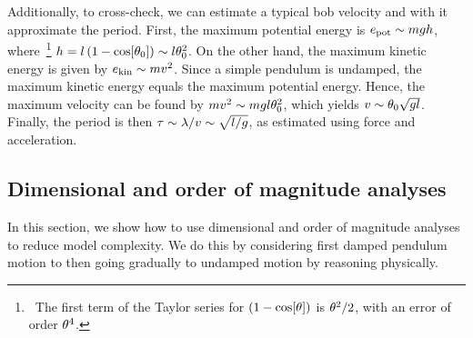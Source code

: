 Additionally, to cross-check, we can estimate a typical bob velocity and with it approximate the period. First, the maximum potential energy is $e_\text{pot}\sim mgh$, where~\footnote{~The first term of the Taylor series for $\left(1 - \cos\!\left[{\theta}\right]\right)$ is $\theta^2/2$, with an error of order $\theta^4$.} $h = l\left(1 - \cos\!\left[{\theta_0}\right]\right)\sim l\theta_0^2$. On the other hand, the maximum kinetic energy is given by $e_\text{kin}\sim mv^2$. Since a simple pendulum is undamped, the maximum kinetic energy equals the maximum potential energy. Hence, the maximum velocity can be found by $mv^2\sim mgl\theta_0^2$, which yields $v\sim\theta_0\sqrt{gl}$. Finally, the period is then $\tau\sim\lambda/v\sim\sqrt{l/g}$, as estimated using force and acceleration.



\subsection{Dimensional and order of magnitude analyses}\label{subsec:dimanalysisorderofmag}
In this section, we show how to use dimensional and order of magnitude analyses to reduce model complexity. We do this by considering first damped pendulum motion to then going gradually to undamped motion by reasoning physically.


